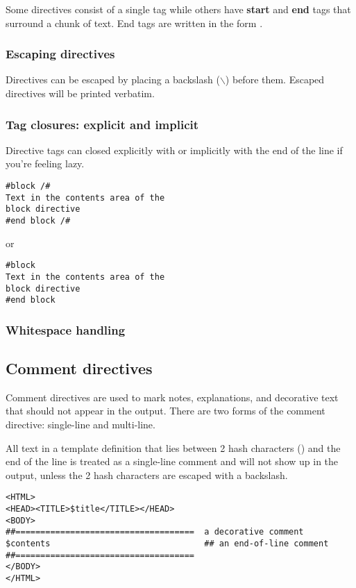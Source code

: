 Some directives consist of a single tag while others have {\bf start} and
{\bf end} tags that surround a chunk of text.  End tags are written in the form
.

\subsubsection{Escaping directives}
Directives can be escaped by placing a backslash ($\backslash$) before them.
Escaped directives will be printed verbatim.

\subsubsection{Tag closures: explicit and implicit}
Directive tags can closed explicitly with \code{/\#} or implicitly with the end
of the line if you're feeling lazy.
\begin{verbatim}
#block /#
Text in the contents area of the
block directive
#end block /#
\end{verbatim}
or
\begin{verbatim}
#block
Text in the contents area of the
block directive
#end block
\end{verbatim}

\subsubsection{Whitespace handling}


\subsection{Comment directives}

Comment directives are used to mark notes, explanations, and decorative text
that should not appear in the output.  There are two forms of the comment
directive: single-line and multi-line.

All text in a template definition that lies between 2 hash characters
(\code{\#\#}) and the end of the line is treated as a single-line comment and
will not show up in the output, unless the 2 hash characters are escaped with a
backslash.
\begin{verbatim}
<HTML>
<HEAD><TITLE>$title</TITLE></HEAD>
<BODY>
##====================================  a decorative comment
$contents                               ## an end-of-line comment
##====================================
</BODY>
</HTML>
\end{verbatim}

